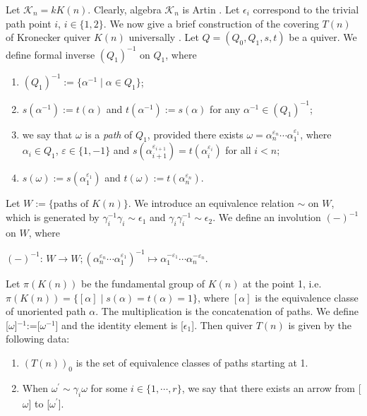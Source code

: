 \documentclass[a4paper,12pt]{amsart}
\newcommand{\cK}{\mathcal{K}}
\begin{document}
Let $ \mathcal{K}_n=kK(n)$. Clearly, algebra $\cK_n$ is Artin \cite[Section 2.1]{Julia}.  Let $\epsilon_i$ correspond to the trivial path point $i$, $i\in\{1, 2\}.$  We now give a brief  construction of the covering $T(n)$ of Kronecker quiver $K(n)$ universally \cite[7.1]{Daniel}. Let $Q=(Q_0,Q_1,s,t)$ be a quiver.  We define formal inverse $(Q_1)^{-1}$ on $Q_1$, where 


\begin{enumerate}
\item  $(Q_1)^{-1}:=\{\alpha^{-1}\mid \alpha \in Q_1\}$;

\item $s(\alpha^{-1}):=t(\alpha)$ and $t(\alpha^{-1}):=s(\alpha)$ for any $\alpha^{-1}\in (Q_1)^{-1}$;

\item  we say that $\omega$  is a \textit{path} of $Q_1$, provided there exists $\omega=\alpha^{\varepsilon_n}_n\cdots \alpha^{\varepsilon_1}_1$, where $\alpha_i\in Q_1$, $\varepsilon\in\{1, -1\}$ and $s(\alpha^{\varepsilon_{i+1}}_{i+1})=t(\alpha^{\varepsilon_i}_i)$ for all $i<n$;
\item $s(\omega):=s(\alpha^{\varepsilon_1}_1)$ and $t(\omega):=t(\alpha^{\varepsilon_n}_n)$.

\end{enumerate}




 
Let $W:=\{\text{paths of $K(n)$}\}$. We introduce an equivalence relation $\sim$  on  $W$, which is generated by $\gamma^{-1}_i \gamma_i\sim \epsilon_1$ and $\gamma_i\gamma^{-1}_i\sim \epsilon_2$. We define an involution $(-)^{-1}$ on $W$, where 
\begin{center}
$(-)^{-1}$: $W\rightarrow W; (\alpha^{\varepsilon_n}_n\cdots \alpha^{\varepsilon_1}_1)^{-1} \mapsto \alpha^{-\varepsilon_1}_1\cdots \alpha^{-\varepsilon_n}_n$.
\end{center}
 Let $\pi(K(n))$  be the fundamental group of $K(n)$ at the point 1, i.e. $\pi(K(n))=\{[\alpha]\mid s(\alpha)=t(\alpha)=1\}$, where $[\alpha]$ is the equivalence classe of unoriented path $\alpha$. The multiplication is  the concatenation of paths. We define [$\omega$]$^{-1}$:=[$\omega^{-1}$] and the identity element is [$\epsilon_1$].  Then quiver $T(n)$ is given by the following data:
\begin{enumerate}


\item $(T(n))_0$ is the set of equivalence classes of paths starting at 1.

\item When $\omega^{'}\sim \gamma_i \omega$ for some $i\in\{1, \cdots, r\}$, we say that there exists an arrow from [$\omega$] to [$\omega^{'}$]. 
\end{enumerate}
\end{document}
